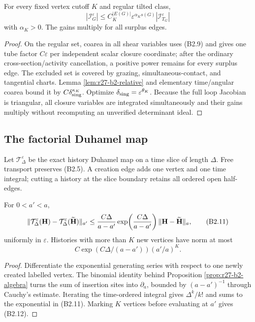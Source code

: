 \begin{theorem}
\label{thm:r27-b2-loop}
For every fixed vertex cutoff $K$ and regular tilted class,
\[
 |\mathcal I_G^\varepsilon|
 \le C_K^{|E(G)|}\varepsilon^{\alpha_Ks(G)}
      |\mathcal I_{T_G}^\varepsilon|                     \tag{B2.10}
\]
with $\alpha_K>0$.  The gains multiply for all surplus edges.
\end{theorem}

\begin{proof}
On the regular set, coarea in all shear variables uses (B2.9) and gives one
tube factor $C\varepsilon$ per independent scalar closure coordinate; after
the ordinary cross-section/activity cancellation, a positive power remains
for every surplus edge.  The excluded set is covered by grazing,
simultaneous-contact, and tangential charts.  Lemma
\ref{lem:r27-b2-relative} and elementary time/angular coarea bound it by
$C\delta_{\rm sing}^{\kappa_K}$.  Optimize
$\delta_{\rm sing}=\varepsilon^{\theta_K}$.  Because the full loop Jacobian is
triangular, all closure variables are integrated simultaneously and their
gains multiply without recomputing an unverified determinant ideal.
\end{proof}

\subsection{The factorial Duhamel map}

Let $\mathcal T_\Delta^\varepsilon$ be the exact history Duhamel map on a time
slice of length $\Delta$.  Free transport preserves (B2.5).  A creation edge
adds one vertex and one time integral; cutting a history at the slice boundary
retains all ordered open half-edges.

\begin{lemma}
\label{lem:r27-b2-duhamel}
For $0<a'<a$,
\[
 \|\mathcal T_\Delta^\varepsilon(\mathbf H)
      -\mathcal T_\Delta^\varepsilon(\widetilde{\mathbf H})\|_{a'}
 \le {C\Delta\over a-a'}
 \exp\!\left({C\Delta\over a-a'}\right)
 \|\mathbf H-\widetilde{\mathbf H}\|_a,                   \tag{B2.11}
\]
uniformly in $\varepsilon$.  Histories with more than $K$ new vertices have
norm at most
\[
 C\exp(C\Delta/(a-a'))(a'/a)^K.                           \tag{B2.12}
\]
\end{lemma}

\begin{proof}
Differentiate the exponential generating series with respect to one newly
created labelled vertex.  The binomial identity behind Proposition
\ref{prop:r27-b2-algebra} turns the sum of insertion sites into
$\partial_a$, bounded by $(a-a')^{-1}$ through Cauchy's estimate.  Iterating
the time-ordered integral gives $\Delta^k/k!$ and sums to the exponential in
(B2.11).  Marking $K$ vertices before evaluating at $a'$ gives (B2.12).
\end{proof}

